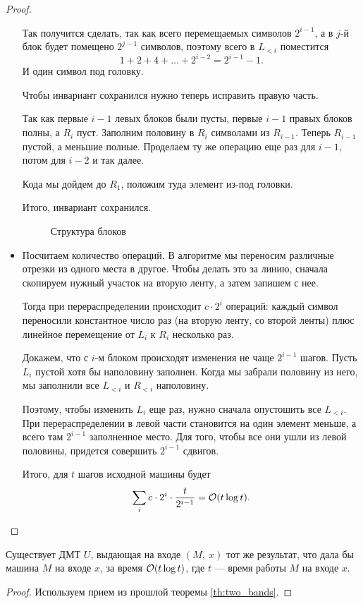 \begin{proof}
\begin{itemize}
			Так получится сделать, так как всего перемещаемых символов $ 2^{i-1}$, а в $ j$-й блок будет помещено $ 2^{j-1}$ символов, поэтому всего в $ L_{<i}$ поместится
			\[
				1 + 2 + 4 + \ldots + 2^{i-2} = 2^{i-1} - 1
			.\]
			И один символ под головку.

			Чтобы инвариант сохранился нужно теперь исправить правую часть.

			Так как первые $ i-1$ левых блоков были пусты, первые $ i-1$ правых блоков полны, а $ R_i$ пуст.
			Заполним половину в $ R_i$ символами из $ R_{i-1}$.
			Теперь $ R_{i-1}$ пустой, а меньшие полные. Проделаем ту же операцию еще раз для $ i-1$, потом для $ i-2$ и так далее.

			Кода мы дойдем до $ R_1$, положим туда элемент из-под головки.

			Итого, инвариант  сохранился.
			\begin{figure}[ht]
				\centering
				\caption{Структура блоков}
				\label{fig:blocks}
			\end{figure}
		\item Посчитаем количество операций. В алгоритме мы переносим различные отрезки из одного места в другое. Чтобы делать это за линию, сначала скопируем нужный участок на вторую ленту, а затем запишем с нее.

			Тогда при перераспределении происходит $ c\cdot 2^{i}$ операций: каждый символ переносили константное число раз (на вторую ленту, со второй ленты)  плюс линейное перемещение от $ L_i$ к $ R_i$ несколько раз.

			Докажем, что с $ i$-м блоком происходят изменения не чаще $ 2^{i-1}$  шагов. Пусть $ L_i$ пустой хотя бы наполовину заполнен. Когда мы забрали половину из него, мы заполнили все $ L_{<i}$ и $ R_{<i}$ наполовину.

			Поэтому, чтобы изменить $ L_i$ еще раз, нужно сначала опустошить все $ L_{<i}$.
			При перераспределении в левой части становится на один элемент меньше, а всего там $ 2^{i-1}$ заполненное место. Для того, чтобы все они ушли из левой половины, придется совершить $ 2^{i-1}$ сдвигов.

			Итого, для $ t$ шагов исходной машины будет
			\[
				\sum_{i}^{}c\cdot 2^{i} \cdot \frac{t}{2^{i-1}} = \mathcal{O}(t \log t)
			.\]
	\end{itemize}
\end{proof}

\begin{thm}[Об универсальной МТ]
	Существует ДМТ $ U$, выдающая на входе $(M, ~ x)$ тот же результат, что дала бы машина $ M$ на входе $ x$, за время $ \mathcal{O}(t \log t)$, где $ t $ --- время работы $ M$ на входе $ x$.
\end{thm}
\begin{proof}
	Используем прием из прошлой теоремы \ref{th:two_bands}.
\end{proof}


